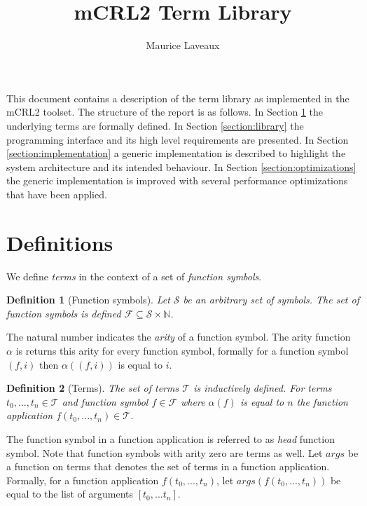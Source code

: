 \documentclass[10pt,a4paper]{article}
\author{Maurice Laveaux}
\title{mCRL2 Term Library}
\newtheorem{definition}{Definition}
\newcommand{\naturalnumbers}{\mathbb{N}}
\newcommand{\arity}{\alpha}
\newcommand{\symbols}{\mathcal{S}}
\newcommand{\functionsymbols}{\mathcal{F}}
\newcommand{\terms}{\mathcal{T}}
\begin{document}
\maketitle

\noindent This document contains a description of the term library as implemented in the mCRL2 toolset.
The structure of the report is as follows.
In Section \ref{section:definitions} the underlying terms are formally defined.
In Section \ref{section:library} the programming interface and its high level requirements are presented.
In Section \ref{section:implementation} a generic implementation is described to highlight the system architecture and its intended behaviour.
In Section \ref{section:optimizations} the generic implementation is improved with several performance optimizations that have been applied.

\section{Definitions}\label{section:definitions}

We define \emph{terms} in the context of a set of \emph{function symbols}. 

\begin{definition}[Function symbols]
Let $\symbols$ be an arbitrary set of symbols.
The set of function symbols is defined $\functionsymbols \subseteq \symbols \times \naturalnumbers$. 
\end{definition}

\noindent The natural number indicates the \emph{arity} of a function symbol. The arity function $\arity$ is returns this arity for every function symbol, formally for a function symbol $(f, i)$ then $\arity((f, i))$ is equal to $i$.

\begin{definition}[Terms]
The set of terms $\terms$ is inductively defined. For terms $t_0, ..., t_n \in \terms$ and function symbol $f \in \functionsymbols$ where $\arity(f)$ is equal to $n$ the \emph{function application} $f(t_0, ..., t_n) \in \terms$.
\end{definition}

\noindent The function symbol in a function application is referred to as \emph{head} function symbol. 
Note that function symbols with arity zero are terms as well. Let $args$ be a function on terms that denotes the set of terms in a function application.
Formally, for a function application $f(t_0, ..., t_n)$, let $args(f(t_0, ..., t_n))$ be equal to the list of arguments $[t_0,...t_n]$.
\end{document}
